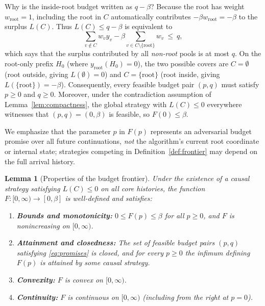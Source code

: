 \documentclass[11pt,letterpaper]{article}
\newtheorem{lemma}{Lemma}[section]
\begin{document}
Why is the inside-root budget written as $q-\beta$? Because the root has weight $w_{\text{root}}=1$, including the root in $C$ automatically contributes $-\beta w_{\text{root}} = -\beta$ to the surplus $L(C)$. Thus $L(C)\le q-\beta$ is equivalent to
\[
  \sum_{v\notin C} w_v y_v - \beta\sum_{v\in C\setminus\{\text{root}\}} w_v\ \le\ q,
\]
which says that the surplus contributed by all \emph{non-root} pools is at most $q$. On the root-only prefix $H_0$ (where $y_{\text{root}}(H_0)=0$), the two possible covers are $C=\emptyset$ (root outside, giving $L(\emptyset)=0$) and $C=\{\text{root}\}$ (root inside, giving $L(\{\text{root}\})=-\beta$). Consequently, every feasible budget pair $(p,q)$ must satisfy $p\ge 0$ and $q\ge 0$. Moreover, under the contradiction assumption of Lemma~\ref{lem:compactness}, the global strategy with $L(C)\le 0$ everywhere witnesses that $(p,q)=(0,\beta)$ is feasible, so $F(0)\le\beta$.

We emphasize that the parameter $p$ in $F(p)$ represents an adversarial budget promise over all future continuations, \emph{not} the algorithm's current root coordinate or internal state; strategies competing in Definition~\ref{def:frontier} may depend on the full arrival history.

\begin{lemma}[Properties of the budget frontier]\label{lem:frontier}
Under the existence of a causal strategy satisfying $L(C)\le 0$ on all core histories, the function $F:[0,\infty)\to[0,\beta]$ is well-defined and satisfies:
\begin{enumerate}
\item \textbf{Bounds and monotonicity:} $0\le F(p)\le\beta$ for all $p\ge 0$, and $F$ is nonincreasing on $[0,\infty)$.
\item \textbf{Attainment and closedness:} The set of feasible budget pairs $(p,q)$ satisfying \eqref{eq:promises} is closed, and for every $p\ge 0$ the infimum defining $F(p)$ is attained by some causal strategy.
\item \textbf{Convexity:} $F$ is convex on $[0,\infty)$.
\item \textbf{Continuity:} $F$ is continuous on $[0,\infty)$ (including from the right at $p=0$).
\end{enumerate}
\end{lemma}
\end{document}
